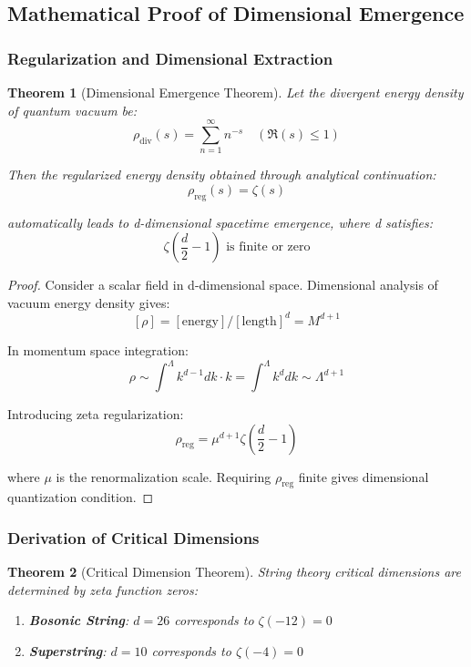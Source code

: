 \documentclass[12pt,a4paper]{article}
\newtheorem{theorem}{Theorem}[section]
\begin{document}
\subsection{Mathematical Proof of Dimensional Emergence}

\subsubsection{Regularization and Dimensional Extraction}

\begin{theorem}[Dimensional Emergence Theorem]
Let the divergent energy density of quantum vacuum be:
$$\rho_{\text{div}}(s) = \sum_{n=1}^{\infty} n^{-s} \quad (\Re(s) \leq 1)$$

Then the regularized energy density obtained through analytical continuation:
$$\rho_{\text{reg}}(s) = \zeta(s)$$

automatically leads to d-dimensional spacetime emergence, where d satisfies:
$$\zeta\left(\frac{d}{2} - 1\right) \text{ is finite or zero}$$
\end{theorem}

\begin{proof}
Consider a scalar field in d-dimensional space. Dimensional analysis of vacuum energy density gives:
$$[\rho] = [\text{energy}]/[\text{length}]^d = M^{d+1}$$

In momentum space integration:
$$\rho \sim \int^{\Lambda} k^{d-1} dk \cdot k = \int^{\Lambda} k^d dk \sim \Lambda^{d+1}$$

Introducing zeta regularization:
$$\rho_{\text{reg}} = \mu^{d+1} \zeta\left(\frac{d}{2} - 1\right)$$

where $\mu$ is the renormalization scale. Requiring $\rho_{\text{reg}}$ finite gives dimensional quantization condition.
\end{proof}

\subsubsection{Derivation of Critical Dimensions}

\begin{theorem}[Critical Dimension Theorem]
String theory critical dimensions are determined by zeta function zeros:

\begin{enumerate}
\item \textbf{Bosonic String}: $d = 26$ corresponds to $\zeta(-12) = 0$
\item \textbf{Superstring}: $d = 10$ corresponds to $\zeta(-4) = 0$
\end{enumerate}
\end{theorem}
\end{document}
